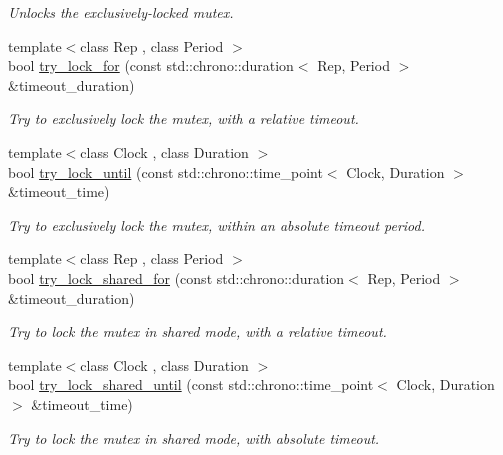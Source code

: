 \begin{DoxyCompactItemize}
\begin{DoxyCompactList}\small\item\em Unlocks the exclusively-\/locked mutex. \end{DoxyCompactList}\item 
{\footnotesize template$<$class Rep , class Period $>$ }\\bool \hyperlink{classcpen333_1_1thread_1_1impl_1_1shared__mutex__exclusive_a1416304bf7a677384b1bd27a678bff9b}{try\+\_\+lock\+\_\+for} (const std\+::chrono\+::duration$<$ Rep, Period $>$ \&timeout\+\_\+duration)
\begin{DoxyCompactList}\small\item\em Try to exclusively lock the mutex, with a relative timeout. \end{DoxyCompactList}\item 
{\footnotesize template$<$class Clock , class Duration $>$ }\\bool \hyperlink{classcpen333_1_1thread_1_1impl_1_1shared__mutex__exclusive_a99324f6fb6f6203faff33b1d41816998}{try\+\_\+lock\+\_\+until} (const std\+::chrono\+::time\+\_\+point$<$ Clock, Duration $>$ \&timeout\+\_\+time)
\begin{DoxyCompactList}\small\item\em Try to exclusively lock the mutex, within an absolute timeout period. \end{DoxyCompactList}\item 
{\footnotesize template$<$class Rep , class Period $>$ }\\bool \hyperlink{classcpen333_1_1thread_1_1impl_1_1shared__mutex__exclusive_a2bae38f1f1d94c6f632db97a58f4cd6f}{try\+\_\+lock\+\_\+shared\+\_\+for} (const std\+::chrono\+::duration$<$ Rep, Period $>$ \&timeout\+\_\+duration)
\begin{DoxyCompactList}\small\item\em Try to lock the mutex in shared mode, with a relative timeout. \end{DoxyCompactList}\item 
{\footnotesize template$<$class Clock , class Duration $>$ }\\bool \hyperlink{classcpen333_1_1thread_1_1impl_1_1shared__mutex__exclusive_ab6bf6ae1010273514d21705cccd5c19f}{try\+\_\+lock\+\_\+shared\+\_\+until} (const std\+::chrono\+::time\+\_\+point$<$ Clock, Duration $>$ \&timeout\+\_\+time)
\begin{DoxyCompactList}\small\item\em Try to lock the mutex in shared mode, with absolute timeout. \end{DoxyCompactList}\end{DoxyCompactItemize}


